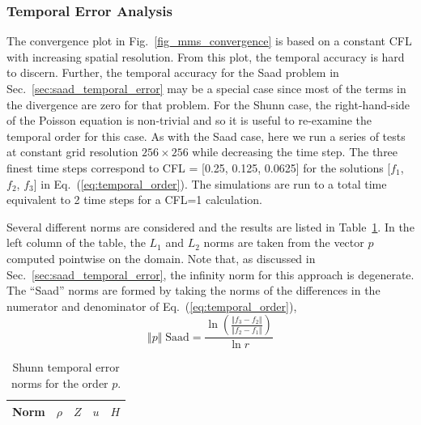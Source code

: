 \documentclass[11pt]{book}
\begin{document}
\subsubsection*{Temporal Error Analysis}

The convergence plot in Fig.~\ref{fig_mms_convergence} is based on a constant CFL with increasing spatial resolution.  From this plot, the temporal accuracy is hard to discern.  Further, the temporal accuracy for the Saad problem in Sec.~\ref{sec:saad_temporal_error} may be a special case since most of the terms in the divergence are zero for that problem.  For the Shunn case, the right-hand-side of the Poisson equation is non-trivial and so it is useful to re-examine the temporal order for this case.  As with the Saad case, here we run a series of tests at constant grid resolution $256 \times 256$ while decreasing the time step.  The three finest time steps correspond to CFL = [0.25, 0.125, 0.0625] for the solutions [$f_1$, $f_2$, $f_3$] in Eq.~(\ref{eq:temporal_order}).  The simulations are run to a total time equivalent to 2 time steps for a CFL=1 calculation.

Several different norms are considered and the results are listed in Table~\ref{tab:shunn_terr_norms}.  In the left column of the table, the $L_1$ and $L_2$ norms are taken from the vector $p$ computed pointwise on the domain.  Note that, as discussed in Sec.~\ref{sec:saad_temporal_error}, the infinity norm for this approach is degenerate.  The ``Saad'' norms are formed by taking the norms of the differences in the numerator and denominator of Eq.~(\ref{eq:temporal_order}),
\begin{equation}
\Vert p \Vert \; \mbox{Saad} = \frac{ \ln \left( \frac{\Vert f_3-f_2 \Vert}{\Vert f_2-f_1 \Vert} \right) }{\ln r}
\end{equation}

\begin{table}[ht]
\centering
\caption[Shunn temporal error norms]{Shunn temporal error norms for the order $p$.}
\begin{tabular}{lcccc}
Norm & $\rho$ & $Z$ & $u$ & $H$ \\
\hline

\end{tabular}
\label{tab:shunn_terr_norms}
\end{table}
\end{document}
